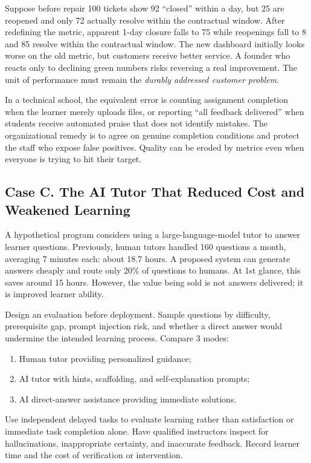 Suppose before repair 100 tickets show 92 ``closed'' within a day, but 25 are reopened and only 72 actually resolve within the contractual window. After redefining the metric, apparent 1-day closure falls to 75 while reopenings fall to 8 and 85 resolve within the contractual window. The new dashboard initially looks worse on the old metric, but customers receive better service. A founder who reacts only to declining green numbers risks reversing a real improvement. The unit of performance must remain the \textit{durably addressed customer problem}.

In a technical school, the equivalent error is counting assignment completion when the learner merely uploads files, or reporting ``all feedback delivered'' when students receive automated praise that does not identify mistakes. The organizational remedy is to agree on genuine completion conditions and protect the staff who expose false positives. Quality can be eroded by metrics even when everyone is trying to hit their target.

\subsection*{Case C. The AI Tutor That Reduced Cost and Weakened Learning}

A hypothetical program considers using a large-language-model tutor to answer learner questions. Previously, human tutors handled 160 questions a month, averaging 7 minutes each: about 18.7 hours. A proposed system can generate answers cheaply and route only 20\% of questions to humans. At 1st glance, this saves around 15 hours. However, the value being sold is not answers delivered; it is improved learner ability.

Design an evaluation before deployment. Sample questions by difficulty, prerequisite gap, prompt injection risk, and whether a direct answer would undermine the intended learning process. Compare 3 modes:
\begin{enumerate}
    \item Human tutor providing personalized guidance;
    \item AI tutor with hints, scaffolding, and self-explanation prompts;
    \item AI direct-answer assistance providing immediate solutions.
\end{enumerate}

Use independent delayed tasks to evaluate learning rather than satisfaction or immediate task completion alone. Have qualified instructors inspect for hallucinations, inappropriate certainty, and inaccurate feedback. Record learner time and the cost of verification or intervention.

